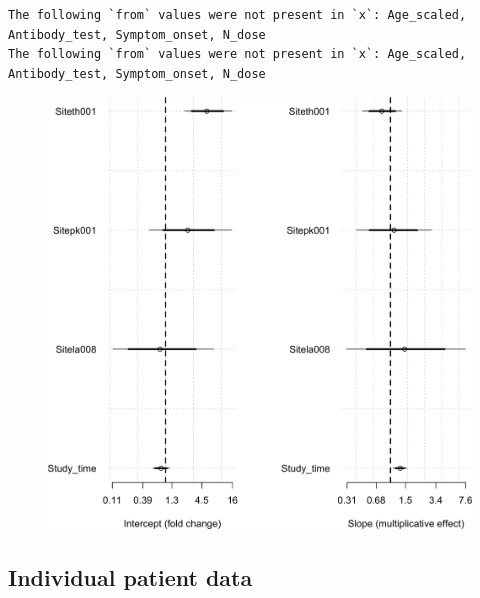 \documentclass[
  letterpaper,
  DIV=11,
  numbers=noendperiod]{scrartcl}
\begin{document}
\begin{verbatim}
The following `from` values were not present in `x`: Age_scaled, Antibody_test, Symptom_onset, N_dose
The following `from` values were not present in `x`: Age_scaled, Antibody_test, Symptom_onset, N_dose
\end{verbatim}

\begin{figure}[H]

{\centering \includegraphics{Fluoxetine_analysis_files/figure-pdf/coef_plot-1.png}

}

\end{figure}

\hypertarget{individual-patient-data}{%
\subsection{Individual patient data}\label{individual-patient-data}}
\end{document}

